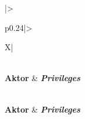 \begingroup
\footnotesize
\begin{styledxltabular}{|>{\raggedright\arraybackslash}p{0.24\textwidth}|>{\raggedright\arraybackslash}X|}
    \hiderowcolors
    \caption{Aktor dan \textit{privileges} yang dimiliki \parencite{Purnama_2026}}\label{decmed-actor-privileges}\\
    \hline
    \textbf{Aktor} & \textbf{\textit{Privileges}} \\
    \hline
    \showrowcolors
    \endfirsthead

    \hiderowcolors
    \caption[]{Aktor dan \textit{privileges} yang dimiliki \parencite{Purnama_2026} (lanjutan)}\\
    \hline
    \textbf{Aktor} & \textbf{\textit{Privileges}} \\
    \hline
    \showrowcolors
    \endhead


\end{styledxltabular}
